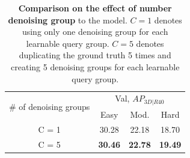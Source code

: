 \begin{table}[h!]
    \centering
    \caption{\textbf{Comparison on the effect of number denoising group} to the model. $C=1$ denotes using only one denoising group for each learnable query group. $C=5$ denotes duplicating the ground truth 5 times and creating 5 denoising groups for each learnable query group.}
    \begin{tabular}{c|ccc}
         \toprule
         \multirow{2}{*}{\# of denoising groups} & \multicolumn{3}{c}{Val, $AP_{3D|R40}$} \\
          & Easy & Mod. & Hard \\ \midrule \midrule
         C = 1 & 30.28 & 22.18 & 18.70\\
         C = 5 & \textbf{30.46} & \textbf{22.78} & \textbf{19.49} \\
         \bottomrule
    \end{tabular}
    \label{tab:denoising_group_ablation}
\end{table}